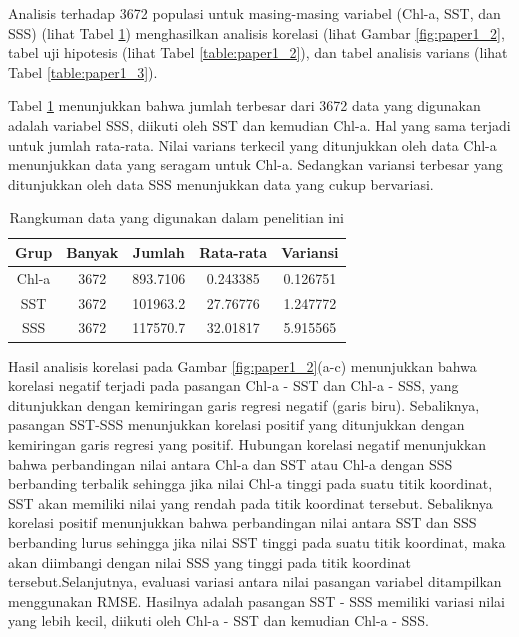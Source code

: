 \begin{spacing}{1.5}
	Analisis terhadap 3672 populasi untuk masing-masing variabel (Chl-a, SST, dan SSS) (lihat Tabel \ref{table:paper1_1}) menghasilkan analisis korelasi (lihat Gambar \ref{fig:paper1_2}, tabel uji hipotesis (lihat Tabel \ref{table:paper1_2}), dan tabel analisis varians (lihat Tabel \ref{table:paper1_3}).
	
	Tabel \ref{table:paper1_1} menunjukkan bahwa jumlah terbesar dari 3672 data yang digunakan adalah variabel SSS, diikuti oleh SST dan kemudian Chl-a. Hal yang sama terjadi untuk jumlah rata-rata. Nilai varians terkecil yang ditunjukkan oleh data Chl-a menunjukkan data yang seragam untuk Chl-a. Sedangkan variansi terbesar yang ditunjukkan oleh data SSS menunjukkan data yang cukup bervariasi.
	
	\begin{table}[H]
		\centering
		\caption{Rangkuman data yang digunakan dalam penelitian ini}
		\label{table:paper1_1}
		\begin{tabular}{|c|c|c|c|c|}
			\hline
			Grup  & Banyak & Jumlah   & Rata-rata & Variansi \\ \hline
			Chl-a & 3672   & 893.7106 & 0.243385  & 0.126751 \\ \hline
			SST   & 3672   & 101963.2 & 27.76776  & 1.247772 \\ \hline
			SSS   & 3672   & 117570.7 & 32.01817  & 5.915565 \\ \hline
		\end{tabular}
	\end{table}

	Hasil analisis korelasi pada Gambar \ref{fig:paper1_2}(a-c) menunjukkan bahwa korelasi negatif terjadi pada pasangan Chl-a - SST dan Chl-a - SSS, yang ditunjukkan dengan kemiringan garis regresi negatif (garis biru). Sebaliknya, pasangan SST-SSS menunjukkan korelasi positif yang ditunjukkan dengan kemiringan garis regresi yang positif. Hubungan korelasi negatif menunjukkan bahwa perbandingan nilai antara Chl-a dan SST atau Chl-a dengan SSS berbanding terbalik sehingga jika nilai Chl-a tinggi pada suatu titik koordinat, SST akan memiliki nilai yang rendah pada titik koordinat tersebut. Sebaliknya korelasi positif menunjukkan bahwa perbandingan nilai antara SST dan SSS berbanding lurus sehingga jika nilai SST tinggi pada suatu titik koordinat, maka akan diimbangi dengan nilai SSS yang tinggi pada titik koordinat tersebut.Selanjutnya, evaluasi variasi antara nilai pasangan variabel ditampilkan menggunakan RMSE. Hasilnya adalah pasangan SST - SSS memiliki variasi nilai yang lebih kecil, diikuti oleh Chl-a - SST dan kemudian Chl-a - SSS.
	

\end{spacing}
